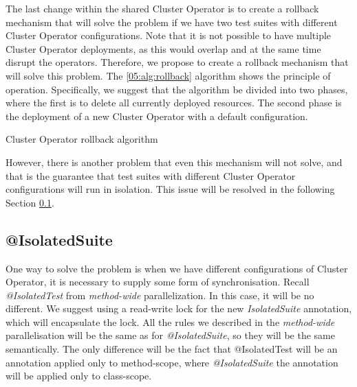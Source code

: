 The last change within the shared Cluster Operator is to create a rollback mechanism that will solve the problem if we have two test suites with different Cluster Operator configurations.
Note that it is not possible to have multiple Cluster Operator deployments, as this would overlap and at the same time disrupt the operators.
Therefore, we propose to create a rollback mechanism that will solve this problem. The \ref{05:alg:rollback} algorithm shows the principle of operation.
Specifically, we suggest that the algorithm be divided into two phases, where the first is to delete all currently deployed resources.
The second phase is the deployment of a new Cluster Operator with a default configuration.
\begin{algorithm}[H]
    \label{05:alg:rollback}
    \caption{Cluster Operator rollback algorithm}
    \begin{algorithmic}[1]
        \EndIf
        \EndIf
        \EndIf

        \State
    \end{algorithmic}
\end{algorithm}

However, there is another problem that even this mechanism will not solve, and that is the guarantee that test suites with different Cluster Operator configurations will run in isolation.
This issue will be resolved in the following Section \ref{05:isolatedsuite}.

\subsection{@IsolatedSuite}
\label{05:isolatedsuite}

One way to solve the problem is when we have different configurations of Cluster Operator, it is necessary to supply some form of synchronisation.
Recall \emph{@IsolatedTest} from \emph{method-wide} parallelization.
In this case, it will be no different.
We suggest using a read-write lock for the new \emph{IsolatedSuite} annotation, which will encapsulate the lock.
All the rules we described in the \emph{method-wide} parallelisation will be the same as for \emph{@IsolatedSuite}, so they will be the same semantically.
The only difference will be the fact that @IsolatedTest will be an annotation applied only to method-scope, where \emph{@IsolatedSuite} the annotation will be applied only to class-scope.

